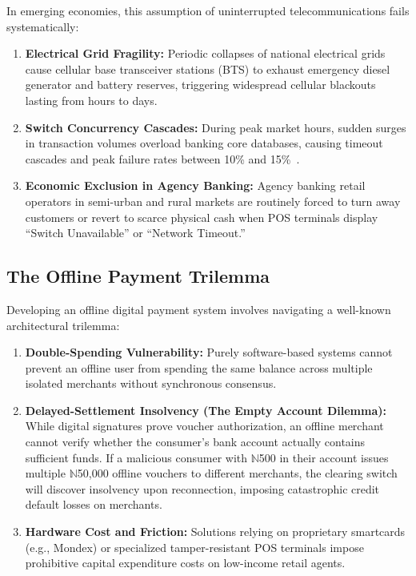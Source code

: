\documentclass[conference]{IEEEtran}
\begin{document}
In emerging economies, this assumption of uninterrupted telecommunications fails systematically:
\begin{enumerate}
    \item \textbf{Electrical Grid Fragility:} Periodic collapses of national electrical grids cause cellular base transceiver stations (BTS) to exhaust emergency diesel generator and battery reserves, triggering widespread cellular blackouts lasting from hours to days.
    \item \textbf{Switch Concurrency Cascades:} During peak market hours, sudden surges in transaction volumes overload banking core databases, causing timeout cascades and peak failure rates between 10\% and 15\%~\cite{cbn2023stability}.
    \item \textbf{Economic Exclusion in Agency Banking:} Agency banking retail operators in semi-urban and rural markets are routinely forced to turn away customers or revert to scarce physical cash when POS terminals display ``Switch Unavailable'' or ``Network Timeout.''
\end{enumerate}

\subsection{The Offline Payment Trilemma}
Developing an offline digital payment system involves navigating a well-known architectural trilemma:
\begin{enumerate}
    \item \textbf{Double-Spending Vulnerability:} Purely software-based systems cannot prevent an offline user from spending the same balance across multiple isolated merchants without synchronous consensus.
    \item \textbf{Delayed-Settlement Insolvency (The Empty Account Dilemma):} While digital signatures prove voucher authorization, an offline merchant cannot verify whether the consumer's bank account actually contains sufficient funds. If a malicious consumer with $\mathbb{N}$500 in their account issues multiple $\mathbb{N}$50,000 offline vouchers to different merchants, the clearing switch will discover insolvency upon reconnection, imposing catastrophic credit default losses on merchants.
    \item \textbf{Hardware Cost and Friction:} Solutions relying on proprietary smartcards (e.g., Mondex) or specialized tamper-resistant POS terminals impose prohibitive capital expenditure costs on low-income retail agents.
\end{enumerate}
\end{document}

